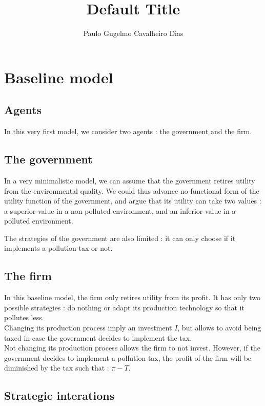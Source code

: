 \documentclass{article}
\title{Default Title}
\author{Paulo Gugelmo Cavalheiro Dias}
\begin{document}
\maketitle

\section{Baseline model}

\subsection{Agents}

In this very first model, we consider two agents : the government and the firm. 

\subsection{The government}

In a very minimalistic model, we can assume that the government retires utility from the environmental quality. 
We could thus advance no functional form of the utility function of the government, and argue that its utility can take two values : a superior value in a non polluted environment, and an inferior value in a polluted environment.

The strategies of the government are also limited : it can only choose if it implements a pollution tax or not.

\subsection{The firm}

In this baseline model, the firm only retires utility from its profit.
It has only two possible strategies : do nothing or adapt its production technology so that it pollutes less. \\
Changing its production process imply an investment $I$, but allows to avoid being taxed in case the government decides to implement the tax. \\
Not changing its production process allows the firm to not invest.
However, if the government decides to implement a pollution tax, the profit of the firm will be diminished by the tax such that : $\pi-T$.

\subsection{Strategic interations}
\end{document}
